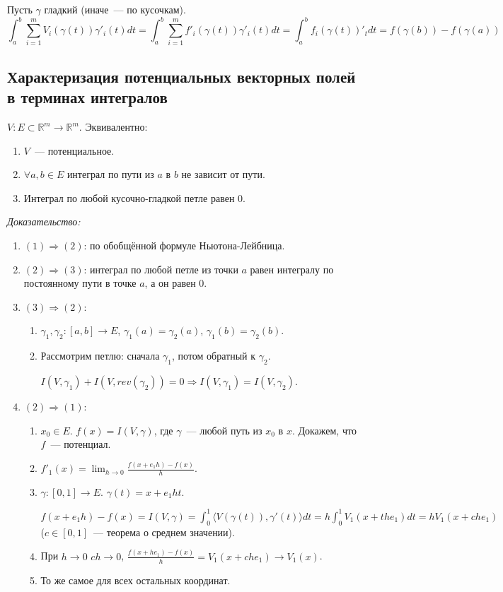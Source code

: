 \documentclass[paper=a4, fontsize=11pt]{article}
\begin{document}
Пусть $\gamma$ гладкий (иначе~--- по кусочкам).
$$\int_a^b \sum_{i=1}^m V_i(\gamma(t))\gamma'_i(t)dt = \int_a^b \sum_{i=1}^m f'_i(\gamma(t))\gamma'_i(t)dt =
\int_a^b f_i(\gamma(t))'_t dt = f(\gamma(b)) - f(\gamma(a))$$

\subsection{Характеризация потенциальных векторных полей в терминах интегралов}
$V: E \subset \mathds{R}^m \to \mathds{R}^m$. Эквивалентно:
\begin{enumerate}
    \item $V$~--- потенциальное.
    \item $\forall a,b \in E$ интеграл по пути из $a$ в $b$ не зависит от пути.
    \item Интеграл по любой кусочно-гладкой петле равен $0$.
\end{enumerate}

\emph{Доказательство:}
\begin{enumerate}
    \item $(1) \Rightarrow (2)$: по обобщённой формуле Ньютона-Лейбница.
    \item $(2) \Rightarrow (3)$: интеграл по любой петле из точки $a$ равен интегралу по постоянному пути в точке $a$, а он равен $0$.
    \item $(3) \Rightarrow (2)$:
    \begin{enumerate}
        \item $\gamma_1,\gamma_2:[a,b] \rightarrow E$, $\gamma_1(a)=\gamma_2(a)$, $\gamma_1(b)=\gamma_2(b)$.
        \item Рассмотрим петлю: сначала $\gamma_1$, потом обратный к $\gamma_2$.

        $I(V,\gamma_1) + I(V,rev(\gamma_2)) = 0 \Rightarrow I(V,\gamma_1) = I(V,\gamma_2)$.
    \end{enumerate}
    \item $(2) \Rightarrow (1)$:
    \begin{enumerate}
        \item $x_0 \in E$. $f(x) = I(V,\gamma)$, где $\gamma$~--- любой путь из $x_0$ в $x$. Докажем, что $f$~--- потенциал.
        \item $f'_1(x) = \lim_{h \to 0} \frac{f(x+e_1h) - f(x)}{h}$.
        \item $\gamma:[0,1] \rightarrow E$. $\gamma(t) = x+e_1ht$.
        
        $f(x+e_1h)-f(x) = I(V,\gamma) = \int_0^1 \langle V(\gamma(t)),\gamma'(t) \rangle dt = h \int_0^1 V_1(x+the_1) dt =
        h V_1(x+che_1)$ ($c \in [0,1]$~--- теорема о среднем значении).
        \item При $h \to 0$ $ch \to 0$, $\frac{f(x+he_1)-f(x)}{h} = V_1(x+che_1) \to V_1(x)$.
        \item То же самое для всех остальных координат.
    \end{enumerate}
\end{enumerate}
\end{document}

